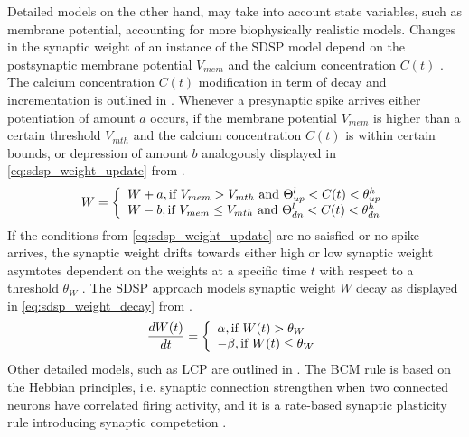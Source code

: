 Detailed models on the other hand, may take into account state variables, such as membrane potential, 
accounting for more biophysically realistic models.
Changes in the synaptic weight of an instance of the \ac{SDSP} model depend on the postsynaptic membrane potential $V_{mem}$ and 
the calcium concentration $C(t)$ \cite{Synaptic_plasticity}.
The calcium concentration $C(t)$  modification in term of decay and incrementation is outlined in \cite{simulation_STDP}.
Whenever a presynaptic spike arrives either potentiation of amount $a$ occurs, if the membrane potential $V_{mem}$ is higher than a certain threshold $V_{mth}$ and the 
calcium concentration $C(t)$ is within certain bounds, or depression of amount $b$ analogously displayed in \autoref{eq:sdsp_weight_update} from \cite{Synaptic_plasticity}.
%
\begin{equation}
    \centering
    \label{eq:sdsp_weight_update} 
    W = 
    \left\{
    \begin{array}{ll}
        W + a, \text{if } V_{mem} > V_{mth} \text{ and } \Theta^l_{up} < C(t) < \theta^h_{up}\\
        W - b, \text{if } V_{mem} \le V_{mth} \text{ and } \Theta^l_{dn} < C(t) < \theta^h_{dn}
    \end{array}
    \right.
\end{equation}
%
If the conditions from \autoref{eq:sdsp_weight_update} are no saisfied or no spike arrives, 
the synaptic weight drifts towards either high or low synaptic weight asymtotes dependent on the weights at a specific time $t$ 
with respect to a threshold $\theta_W$ \cite{Synaptic_plasticity}.
The \ac{SDSP} approach models synaptic weight $W$ decay as displayed in \autoref{eq:sdsp_weight_decay} from \cite{Synaptic_plasticity}.
%
\begin{equation}
    \centering
    \label{eq:sdsp_weight_decay}
    \frac{dW(t)}{dt} = 
    \left\{
    \begin{array}{ll}
        \alpha, \text{if } W(t) > \theta_W\\
        - \beta, \text{if } W(t) \le \theta_W\\
    \end{array}
    \right.
\end{equation}
%
Other detailed models, such as \ac{LCP} are outlined in \cite{Synaptic_plasticity}.
The \ac{BCM} rule is based on the Hebbian principles, i.e. synaptic connection strengthen when two connected neurons have correlated firing activity, 
and it is a rate-based synaptic plasticity rule introducing synaptic competetion \cite{simulation_STDP}.
